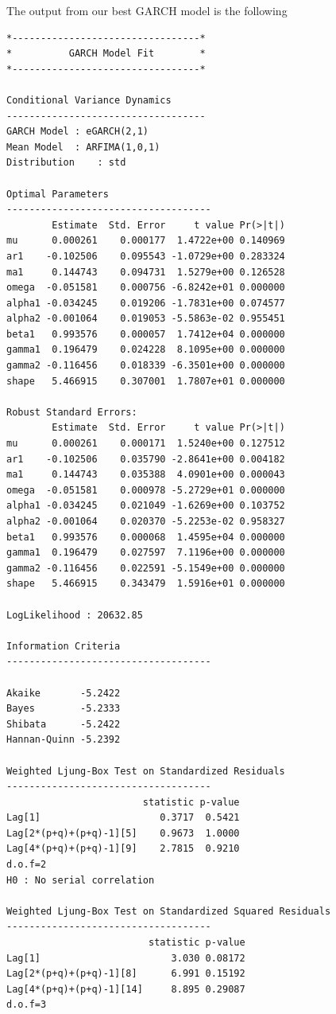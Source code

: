 \documentclass{article}
\begin{document}
\noindent The output from our best GARCH model is the following
\clearpage
\begin{verbatim}
*---------------------------------*
*          GARCH Model Fit        *
*---------------------------------*

Conditional Variance Dynamics 	
-----------------------------------
GARCH Model	: eGARCH(2,1)
Mean Model	: ARFIMA(1,0,1)
Distribution	: std 

Optimal Parameters
------------------------------------
        Estimate  Std. Error     t value Pr(>|t|)
mu      0.000261    0.000177  1.4722e+00 0.140969
ar1    -0.102506    0.095543 -1.0729e+00 0.283324
ma1     0.144743    0.094731  1.5279e+00 0.126528
omega  -0.051581    0.000756 -6.8242e+01 0.000000
alpha1 -0.034245    0.019206 -1.7831e+00 0.074577
alpha2 -0.001064    0.019053 -5.5863e-02 0.955451
beta1   0.993576    0.000057  1.7412e+04 0.000000
gamma1  0.196479    0.024228  8.1095e+00 0.000000
gamma2 -0.116456    0.018339 -6.3501e+00 0.000000
shape   5.466915    0.307001  1.7807e+01 0.000000

Robust Standard Errors:
        Estimate  Std. Error     t value Pr(>|t|)
mu      0.000261    0.000171  1.5240e+00 0.127512
ar1    -0.102506    0.035790 -2.8641e+00 0.004182
ma1     0.144743    0.035388  4.0901e+00 0.000043
omega  -0.051581    0.000978 -5.2729e+01 0.000000
alpha1 -0.034245    0.021049 -1.6269e+00 0.103752
alpha2 -0.001064    0.020370 -5.2253e-02 0.958327
beta1   0.993576    0.000068  1.4595e+04 0.000000
gamma1  0.196479    0.027597  7.1196e+00 0.000000
gamma2 -0.116456    0.022591 -5.1549e+00 0.000000
shape   5.466915    0.343479  1.5916e+01 0.000000

LogLikelihood : 20632.85 

Information Criteria
------------------------------------
                    
Akaike       -5.2422
Bayes        -5.2333
Shibata      -5.2422
Hannan-Quinn -5.2392

Weighted Ljung-Box Test on Standardized Residuals
------------------------------------
                        statistic p-value
Lag[1]                     0.3717  0.5421
Lag[2*(p+q)+(p+q)-1][5]    0.9673  1.0000
Lag[4*(p+q)+(p+q)-1][9]    2.7815  0.9210
d.o.f=2
H0 : No serial correlation

Weighted Ljung-Box Test on Standardized Squared Residuals
------------------------------------
                         statistic p-value
Lag[1]                       3.030 0.08172
Lag[2*(p+q)+(p+q)-1][8]      6.991 0.15192
Lag[4*(p+q)+(p+q)-1][14]     8.895 0.29087
d.o.f=3


\end{verbatim}
\end{document}
